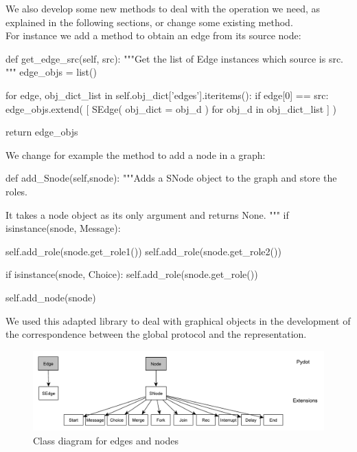 \documentclass[a4paper,11pt,twoside]{report}
\begin{document}
We also develop some new methods to deal with the operation we need, as explained in the following sections, or change some existing method.\\
For instance we add a method to obtain an edge from its source node:
\begin{SJLISTING}
    def get_edge_src(self, src):
        """Get the list of Edge instances which source is src.
        """
        edge_objs = list()
                           
        for edge, obj_dict_list in self.obj_dict['edges'].iteritems():
            if edge[0] == src:
                edge_objs.extend( [ SEdge( obj_dict = obj_d ) for obj_d in obj_dict_list ] )
        
        return edge_objs
\end{SJLISTING}
We change for example the method to add a node in a graph:
\begin{SJLISTING}
    def add_Snode(self,snode):
        """Adds a SNode object to the graph and store the roles.

        It takes a node object as its only argument and returns
        None.
        """
        if isinstance(snode, Message):

            self.add_role(snode.get_role1())
            self.add_role(snode.get_role2())
            
        if isinstance(snode, Choice):
            self.add_role(snode.get_role())
        
        self.add_node(snode)
\end{SJLISTING} 

We used this adapted library to deal with graphical objects in the development of the correspondence between the global protocol and the representation.

\begin{figure}[h]
\begin{center}
\includegraphics[scale=0.7]{node_organisation}
\end{center}
\caption{Class diagram for edges and nodes}
\label{fig:node_organisation}
\end{figure}
\end{document}
